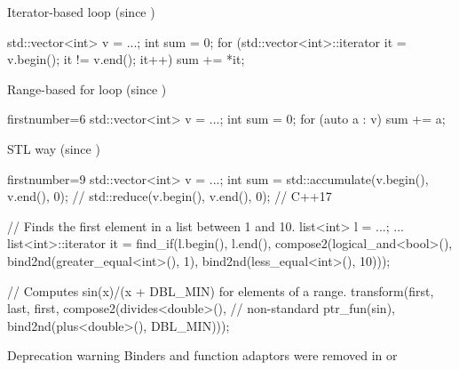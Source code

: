 
\begin{frame}[fragile]
  \begin{block}{Iterator-based loop (since )}
    \begin{cppcode*}{}
      std::vector<int> v = ...;
      int sum = 0;
      for (std::vector<int>::iterator it = v.begin();
           it != v.end(); it++)
        sum += *it;
    \end{cppcode*}
  \end{block}
  \pause
  \begin{block}{Range-based for loop (since )}
    \begin{cppcode*}{firstnumber=6}
      std::vector<int> v = ...;
      int sum = 0;
      for (auto a : v) { sum += a; }
    \end{cppcode*}
  \end{block}
  \pause
  \begin{exampleblock}{STL way (since )}
    \begin{cppcode*}{firstnumber=9}
      std::vector<int> v = ...;
      int sum = std::accumulate(v.begin(), v.end(), 0);
      // std::reduce(v.begin(), v.end(), 0); // C++17
    \end{cppcode*}
  \end{exampleblock}
\end{frame}

\begin{frame}[fragile]
  \begin{cppcode}
    // Finds the first element in a list between 1 and 10.
    list<int> l = ...;
    ...
    list<int>::iterator it =
      find_if(l.begin(), l.end(),
              compose2(logical_and<bool>(),
                       bind2nd(greater_equal<int>(), 1),
                       bind2nd(less_equal<int>(), 10)));

    // Computes sin(x)/(x + DBL_MIN) for elements of a range.
    transform(first, last, first,
              compose2(divides<double>(), // non-standard
                       ptr_fun(sin),
                       bind2nd(plus<double>(), DBL_MIN)));
  \end{cppcode}
  \begin{alertblock}{Deprecation warning}
  	Binders and function adaptors were removed in  or 
  \end{alertblock}
\end{frame}

